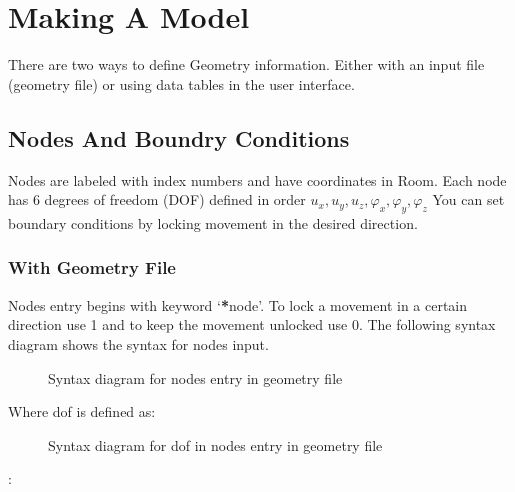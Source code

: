 \documentclass[letterpaper,10pt,english]{sphinxmanual}
\begin{document}
\section{Making A Model}
\label{\detokenize{making_a_model:making-a-model}}\label{\detokenize{making_a_model::doc}}
There are two ways to define Geometry information. Either with an input file (geometry file) or using data
tables in the user interface.


\subsection{Nodes And Boundry Conditions}
\label{\detokenize{making_a_model:nodes-and-boundry-conditions}}\label{\detokenize{making_a_model:nodes-input}}
Nodes are labeled with index numbers and have coordinates in Room.
Each node has 6 degrees of freedom (DOF) defined in order \(u_x, u_y, u_z, \varphi_x, \varphi_y, \varphi_z\)
You can set boundary conditions by locking movement in the desired direction.


\subsubsection{With Geometry File}
\label{\detokenize{making_a_model:with-geometry-file}}
Nodes entry begins with keyword ‘{\color{red}\bfseries{}*}node’.
To lock a movement in a certain direction use 1 and to keep the movement unlocked use 0.
The following syntax diagram shows the syntax for nodes input.

\begin{figure}[htbp]
\centering
\capstart

\noindent{}
\caption{Syntax diagram for nodes entry in geometry file}\label{\detokenize{making_a_model:id17}}\end{figure}

Where dof is defined as:

\begin{figure}[htbp]
\centering
\capstart

\noindent{}
\caption{Syntax diagram for dof in nodes entry in geometry file}\label{\detokenize{making_a_model:id18}}\end{figure}

:
\end{document}
